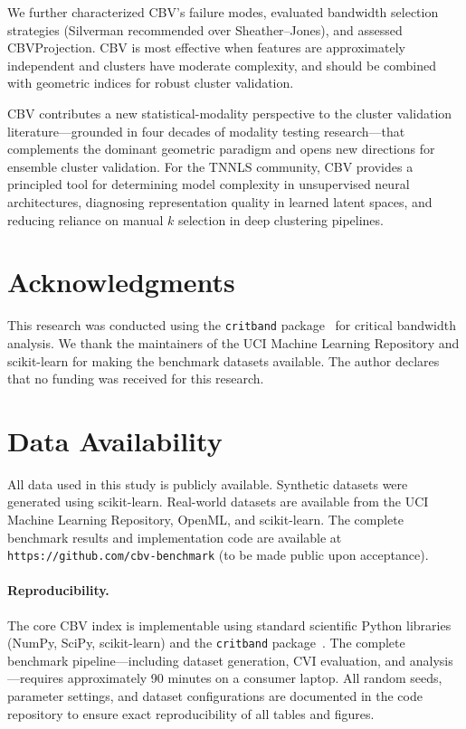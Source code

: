 \documentclass[journal]{IEEEtran}
\begin{document}
We further characterized CBV's failure modes, evaluated bandwidth selection strategies (Silverman recommended over Sheather--Jones), and assessed CBVProjection. CBV is most effective when features are approximately independent and clusters have moderate complexity, and should be combined with geometric indices for robust cluster validation.

CBV contributes a new statistical-modality perspective to the cluster validation literature---grounded in four decades of modality testing research---that complements the dominant geometric paradigm and opens new directions for ensemble cluster validation. For the TNNLS community, CBV provides a principled tool for determining model complexity in unsupervised neural architectures, diagnosing representation quality in learned latent spaces, and reducing reliance on manual $k$ selection in deep clustering pipelines.

\section*{Acknowledgments}

This research was conducted using the \texttt{critband} package~\cite{zhang2026critband, critband2025} for critical bandwidth analysis. We thank the maintainers of the UCI Machine Learning Repository and scikit-learn for making the benchmark datasets available. The author declares that no funding was received for this research.

\section*{Data Availability}

All data used in this study is publicly available. Synthetic datasets were generated using scikit-learn. Real-world datasets are available from the UCI Machine Learning Repository, OpenML, and scikit-learn. The complete benchmark results and implementation code are available at \texttt{https://github.com/cbv-benchmark} (to be made public upon acceptance).

\paragraph{Reproducibility.}
The core CBV index is implementable using standard scientific Python libraries (NumPy, SciPy, scikit-learn) and the \texttt{critband} package~\cite{zhang2026critband, critband2025}. The complete benchmark pipeline---including dataset generation, CVI evaluation, and analysis---requires approximately 90 minutes on a consumer laptop. All random seeds, parameter settings, and dataset configurations are documented in the code repository to ensure exact reproducibility of all tables and figures.
\end{document}
